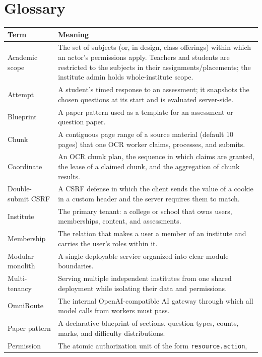 \chapter*{Glossary}

\begin{center}
\small
\begin{longtable}{@{}p{3.9cm}p{10.2cm}@{}}
\toprule
\textbf{Term} & \textbf{Meaning} \\
\midrule
\endhead
Academic scope & The set of subjects (or, in design, class offerings) within
which an actor's permissions apply. Teachers and students are restricted to the
subjects in their assignments/placements; the institute admin holds
whole-institute scope. \\
Attempt & A student's timed response to an assessment; it snapshots the chosen
questions at its start and is evaluated server-side. \\
Blueprint & A paper pattern used as a template for an assessment or question
paper. \\
Chunk & A contiguous page range of a source material (default 10 pages) that one
OCR worker claims, processes, and submits. \\
Coordinate & An OCR chunk plan, the sequence in which claims are granted, the
lease of a claimed chunk, and the aggregation of chunk results. \\
Double-submit CSRF & A CSRF defense in which the client sends the value of a
cookie in a custom header and the server requires them to match. \\
Institute & The primary tenant: a college or school that owns users,
memberships, content, and assessments. \\
Membership & The relation that makes a user a member of an institute and carries
the user's roles within it. \\
Modular monolith & A single deployable service organized into clear module
boundaries. \\
Multi-tenancy & Serving multiple independent institutes from one shared
deployment while isolating their data and permissions. \\
OmniRoute & The internal OpenAI-compatible AI gateway through which all model
calls from workers must pass. \\
Paper pattern & A declarative blueprint of sections, question types, counts,
marks, and difficulty distributions. \\
Permission & The atomic authorization unit of the form \texttt{resource.action},

\end{longtable}
\end{center}
